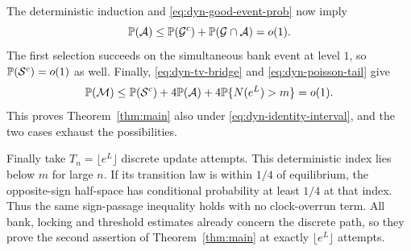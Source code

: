 The deterministic induction and \eqref{eq:dyn-good-event-prob} now imply
\[
 \mathbb P(\mathcal A)
 \leq\mathbb P(\mathcal G^c)
       +\mathbb P(\mathcal G\cap\mathcal A)=o(1).
\]
The first selection succeeds on the simultaneous bank event at level $1$,
so $\mathbb P(\mathcal S^c)=o(1)$ as well. Finally,
\eqref{eq:dyn-tv-bridge} and \eqref{eq:dyn-poisson-tail} give
\[
 \mathbb P(\mathcal M)
 \leq\mathbb P(\mathcal S^c)+4\mathbb P(\mathcal A)
       +4\mathbb P\{N(e^L)>m\}=o(1).
\]
This proves Theorem~\ref{thm:main} also under
\eqref{eq:dyn-identity-interval}, and the two cases exhaust the
possibilities.

Finally take $T_n=\lfloor e^L\rfloor$ discrete update attempts.
This deterministic index lies below $m$ for large $n$. If its transition
law is within $1/4$ of equilibrium, the opposite-sign half-space has
conditional probability at least $1/4$ at that index. Thus the same
sign-passage inequality holds with no clock-overrun term. All bank,
locking and threshold estimates already concern the discrete path,
so they prove the second assertion of Theorem~\ref{thm:main} at exactly
$\lfloor e^L\rfloor$ attempts.
